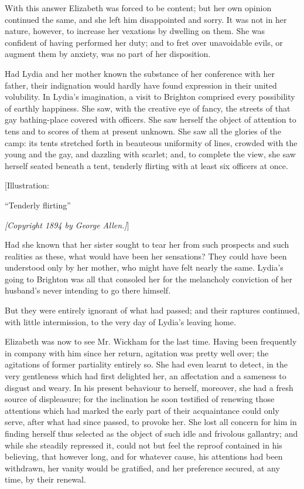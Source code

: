 \documentclass[12pt]{book}
\begin{document}
With this answer Elizabeth was forced to be content; but her own opinion continued the same, and she left him disappointed and sorry. It was not in her nature, however, to increase her vexations by dwelling on them. She was confident of having performed her duty; and to fret over unavoidable evils, or augment them by anxiety, was no part of her disposition.

Had Lydia and her mother known the substance of her conference with her father, their indignation would hardly have found expression in their united volubility. In Lydia's imagination, a visit to Brighton comprised every possibility of earthly happiness. She saw, with the creative eye of fancy, the streets of that gay bathing-place covered with officers. She saw herself the object of attention to tens and to scores of them at present unknown. She saw all the glories of the camp: its tents stretched forth in beauteous uniformity of lines, crowded with the young and the gay, and dazzling with scarlet; and, to complete the view, she saw herself seated beneath a tent, tenderly flirting with at least six officers at once.

[Illustration:

``Tenderly flirting''

\emph{[\textit{Copyright 1894 by George Allen.}]}]

Had she known that her sister sought to tear her from such prospects and such realities as these, what would have been her sensations? They could have been understood only by her mother, who might have felt nearly the same. Lydia's going to Brighton was all that consoled her for the melancholy conviction of her husband's never intending to go there himself.

But they were entirely ignorant of what had passed; and their raptures continued, with little intermission, to the very day of Lydia's leaving home.

Elizabeth was now to see Mr. Wickham for the last time. Having been frequently in company with him since her return, agitation was pretty well over; the agitations of former partiality entirely so. She had even learnt to detect, in the very gentleness which had first delighted her, an affectation and a sameness to disgust and weary. In his present behaviour to herself, moreover, she had a fresh source of displeasure; for the inclination he soon testified of renewing those attentions which had marked the early part of their acquaintance could only serve, after what had since passed, to provoke her. She lost all concern for him in finding herself thus selected as the object of such idle and frivolous gallantry; and while she steadily repressed it, could not but feel the reproof contained in his believing, that however long, and for whatever cause, his attentions had been withdrawn, her vanity would be gratified, and her preference secured, at any time, by their renewal.
\end{document}
